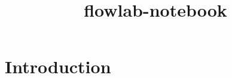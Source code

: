 \documentclass{article}
\title{flowlab-notebook}
\begin{document}
\maketitle

\section{Introduction}
\end{document}
